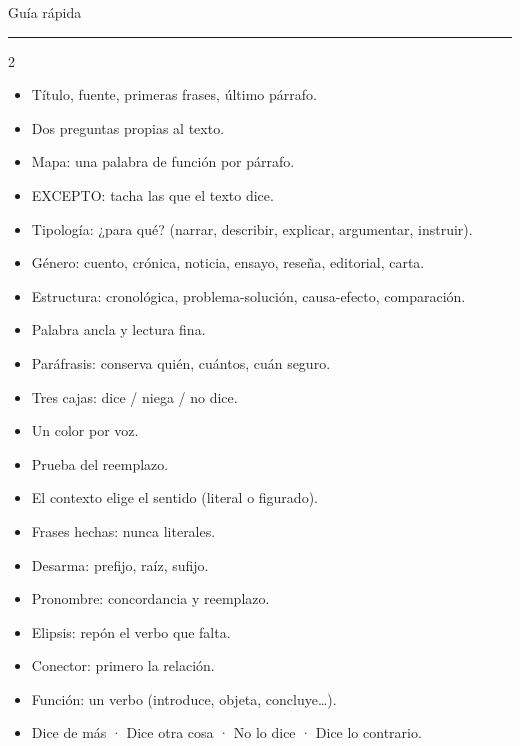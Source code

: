 \makeatletter
\cleardoublepage\renewcommand{\zuka@mundoactual}{Guía rápida}
{\sffamily\fontsize{26}{30}\selectfont\firalight Guía rápida\par}\vspace{2pt}
{\color{zlime}\rule{18mm}{1.6pt}}\par\vspace{6pt}

\begin{multicols}{2}\small
{}
\begin{itemize}
  \item Título, fuente, primeras frases, último párrafo.
  \item Dos preguntas propias al texto.
  \item Mapa: una palabra de función por párrafo.
  \item EXCEPTO: tacha las que el texto dice.
\end{itemize}
\begin{itemize}
  \item Tipología: ¿para qué? (narrar, describir, explicar, argumentar, instruir).
  \item Género: cuento, crónica, noticia, ensayo, reseña, editorial, carta.
  \item Estructura: cronológica, problema-solución, causa-efecto, comparación.
\end{itemize}
\begin{itemize}
  \item Palabra ancla y lectura fina.
  \item Paráfrasis: conserva quién, cuántos, cuán seguro.
  \item Tres cajas: dice / niega / no dice.
  \item Un color por voz.
\end{itemize}
\columnbreak
{}
\begin{itemize}
  \item Prueba del reemplazo.
  \item El contexto elige el sentido (literal o figurado).
  \item Frases hechas: nunca literales.
  \item Desarma: prefijo, raíz, sufijo.
\end{itemize}
\begin{itemize}
  \item Pronombre: concordancia y reemplazo.
  \item Elipsis: repón el verbo que falta.
  \item Conector: primero la relación.
  \item Función: un verbo (introduce, objeta, concluye…).
\end{itemize}
\begin{itemize}
  \item Dice de más · Dice otra cosa · No lo dice · Dice lo contrario.
\end{itemize}
\end{multicols}

